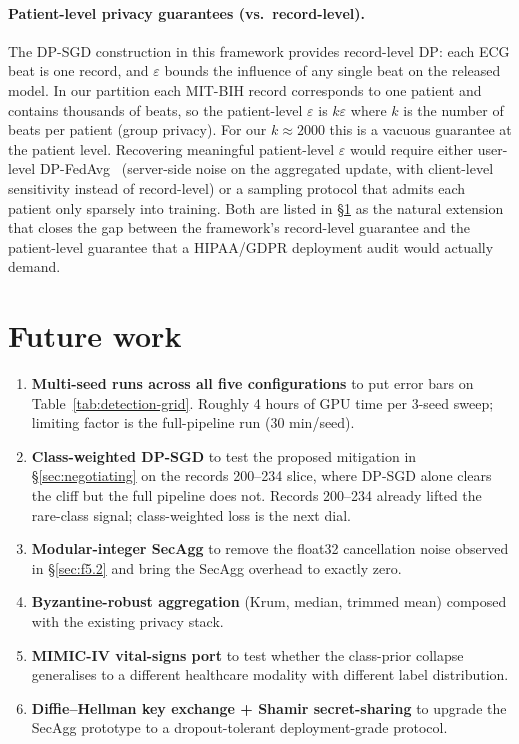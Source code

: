 \documentclass[11pt,a4paper]{report}
\begin{document}
\paragraph{Patient-level privacy guarantees (vs.\ record-level).}
The DP-SGD construction in this framework provides record-level DP:
each ECG beat is one record, and $\varepsilon$ bounds the influence of any single
beat on the released model. In our partition each MIT-BIH record
corresponds to one patient and contains thousands of beats, so the
patient-level $\varepsilon$ is $k\varepsilon$ where $k$ is the number of beats per
patient (group privacy). For our $k \approx 2000$ this is a vacuous
guarantee at the patient level. Recovering meaningful patient-level $\varepsilon$
would require either user-level DP-FedAvg~\cite{mcmahan2018dpfedavg}
(server-side noise on the aggregated update, with client-level
sensitivity instead of record-level) or a sampling protocol that admits
each patient only sparsely into training. Both are listed in
\S\ref{sec:future} as the natural extension that closes the gap between
the framework's record-level guarantee and the patient-level
guarantee that a HIPAA/GDPR deployment audit would actually demand.

\section{Future work}\label{sec:future}

\begin{enumerate}[leftmargin=*]
  \item \textbf{Multi-seed runs across all five configurations} to put error
  bars on Table~\ref{tab:detection-grid}. Roughly 4 hours of GPU time per
  3-seed sweep; limiting factor is the full-pipeline run (30 min/seed).
  \item \textbf{Class-weighted DP-SGD} to test the proposed mitigation
  in \S\ref{sec:negotiating} on the records 200--234 slice, where
  DP-SGD alone clears the cliff but the full pipeline does not.
  Records 200--234 already lifted the rare-class signal; class-weighted
  loss is the next dial.
  \item \textbf{Modular-integer SecAgg} to remove the float32 cancellation
  noise observed in \S\ref{sec:f5.2} and bring the SecAgg overhead to
  exactly zero.
  \item \textbf{Byzantine-robust aggregation} (Krum, median, trimmed mean)
  composed with the existing privacy stack.
  \item \textbf{MIMIC-IV vital-signs port} to test whether the class-prior
  collapse generalises to a different healthcare modality with different
  label distribution.
  \item \textbf{Diffie--Hellman key exchange + Shamir secret-sharing} to
  upgrade the SecAgg prototype to a dropout-tolerant deployment-grade
  protocol.
\end{enumerate}
\end{document}
